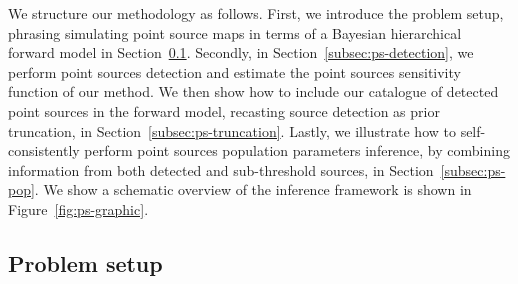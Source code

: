 We structure our methodology as follows. First, we introduce the problem setup, phrasing simulating point source maps in terms of a Bayesian hierarchical forward model in Section~\ref{subsec:ps-sim}. Secondly, in Section~\ref{subsec:ps-detection}, we perform point sources detection and estimate the point sources sensitivity function of our method. We then show how to include our catalogue of detected point sources in the forward model, recasting source detection as prior truncation, in Section~\ref{subsec:ps-truncation}. Lastly, we illustrate how to self-consistently perform point sources population parameters inference, by combining information from both detected and sub-threshold sources, in Section~\ref{subsec:ps-pop}. We show a schematic overview of the inference framework is shown in Figure~\ref{fig:ps-graphic}.

%  
%  

\subsection{Problem setup} \label{subsec:ps-sim}

